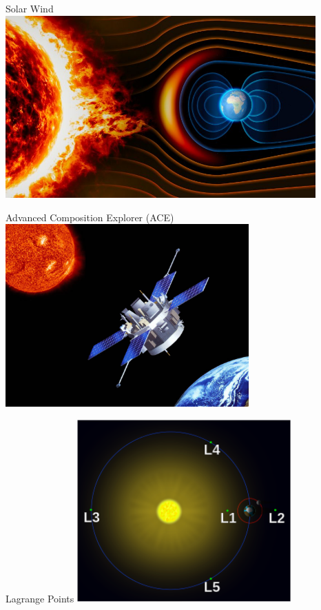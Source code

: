 \documentclass[aspectratio=169,xcolor=dvipsnames]{beamer}
\begin{document}
\begin{frame}{Solar Wind}
    \centering
    \includegraphics[height=7cm]{solarwind.jpg}\\
\end{frame}
\begin{frame}{Advanced Composition Explorer (ACE)}
\centering
    \includegraphics[height=7cm]{ACE.jpg}\\
\end{frame}
\begin{frame}{Lagrange Points}
   \centering
    \includegraphics[height=7cm]{lagrange.png}\\
\end{frame}
\end{document}

